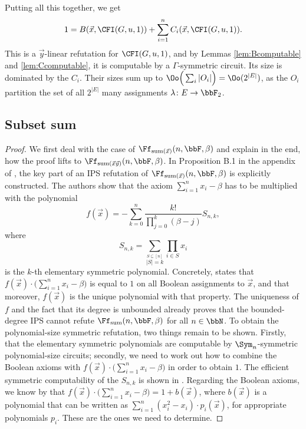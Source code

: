 \documentclass[a4paper,UKenglish,cleveref, autoref, thm-restate]{lipics-v2021}
\begin{document}
Putting all this together, we get
\[
1 = B(\vec x, \CFI(G,u,1)) + \sum_{i=1}^n C_i(\vec x,  \CFI(G,u,1)).
\]	
This is a $\vec y$-linear refutation for $\CFI(G,u,1)$, and by Lemmas \ref{lem:Bcomputable} and \ref{lem:Ccomputable}, it is computable by a $\Gamma$-symmetric circuit. Its size is dominated by the $C_i$. Their sizes sum up to $\Oo\Big(\sum_i |O_i| \Big) = \Oo(2^{|E|})$, as the $O_i$ partition the set of all $2^{|E|}$ many assignments $\lambda \colon E \to \bbF_2$.





\subsection{Subset sum}
\subsetsumUpperBound*
\begin{proof}
	We first deal with the case of $\Ff_{\text{sum}(\vec x)}(n,\bbF,\beta)$ and explain in the end, how the proof lifts to $\Ff_{\text{sum}(\vec x \vec y)}(n,\bbF,\beta)$. 
	In Proposition B.1 in the appendix of \cite{lowerbounds_IPS}, the key part of an IPS refutation
	of $\Ff_{\text{sum}(\vec x)}(n,\bbF,\beta)$ is explicitly constructed. The authors show that the axiom 	$\sum_{i=1}^n x_i - \beta$ has to be multiplied with the polynomial
	\[
	f(\vec x) = - \sum_{k=0}^n \frac{k!}{\prod_{j=0}^k (\beta -j)} S_{n,k},
	\]
	where \[
	S_{n,k} = \sum_{\stackrel{S \subseteq [n]}{|S| = k}} \prod_{i \in S} x_i
	\] is the $k$-th elementary symmetric polynomial. Concretely, \cite[Proposition B.1]{lowerbounds_IPS} states that $f(\vec x) \cdot \Big(\sum_{i=1}^n x_i - \beta \Big)$ is equal to $1$ on all Boolean assignments to $\vec x$, and that moreover, $f(\vec x)$ is the unique polynomial with that property. The uniqueness of $f$ and the fact that its degree is unbounded already proves that the bounded-degree IPS cannot refute $\Ff_{\text{sum}}(n,\bbF,\beta)$ for all $n \in \bbN$. To obtain the polynomial-size symmetric refutation, two things remain to be shown. Firstly, that the elementary symmetric polynomials are computable by $\Sym_n$-symmetric polynomial-size circuits; secondly, we need to work out how to combine the Boolean axioms with 
	$f(\vec x) \cdot \Big(\sum_{i=1}^n x_i - \beta \Big)$ in order to obtain $1$. The efficient symmetric computability of the $S_{n,k}$ is shown in \cite{shpilka2001depth}. 
	Regarding the Boolean axioms, we know by \cite[Proposition B.1]{lowerbounds_IPS} that $f(\vec x) \cdot \Big(\sum_{i=1}^n x_i - \beta \Big) = 1 + b(\vec x)$, where $b(\vec x)$ is a polynomial that can be written as $\sum_{i=1}^n (x_i^2 -x_i) \cdot p_i(\vec x)$, for appropriate polynomials $p_i$. These are the ones we need to determine. 

\end{proof}
\end{document}
